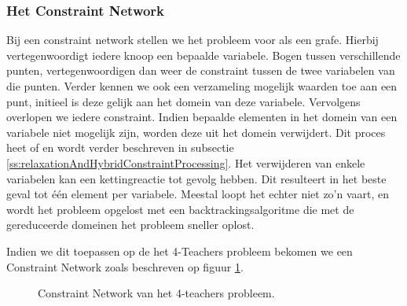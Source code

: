 \subsubsection{Het Constraint Network}
Bij een constraint network stellen we het probleem voor als een grafe. Hierbij vertegenwoordigt iedere knoop een bepaalde variabele. Bogen tussen verschillende punten, vertegenwoordigen dan weer de constraint tussen de twee variabelen van die punten. Verder kennen we ook een verzameling mogelijk waarden toe aan een punt, initieel is deze gelijk aan het domein van deze variabele. Vervolgens overlopen we iedere constraint. Indien bepaalde elementen in het domein van een variabele niet mogelijk zijn, worden deze uit het domein verwijdert. Dit proces heet  of  en wordt verder beschreven in subsectie \ref{ss:relaxationAndHybridConstraintProcessing}. Het verwijderen van enkele variabelen kan een kettingreactie tot gevolg hebben. Dit resulteert in het beste geval tot \'e\'en element per variabele. Meestal loopt het echter niet zo'n vaart, en wordt het probleem opgelost met een backtrackingsalgoritme die met de gereduceerde domeinen het probleem sneller oplost.
\begin{leftbar}
Indien we dit toepassen op de het 4-Teachers probleem bekomen we een Constraint Network zoals beschreven op figuur \ref{fig:fourTeachersConstraintNetwork}.
\end{leftbar}
\begin{figure}[htb]
\centering
{}
\caption{Constraint Network van het 4-teachers probleem.}
\label{fig:fourTeachersConstraintNetwork}
\end{figure}
